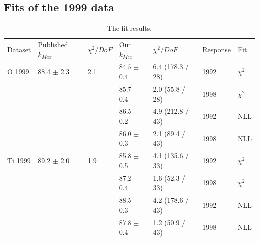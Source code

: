 \subsection { Fits of the 1999 data }

\begin{table}[H]
  \begin{center}
    \begin{tabular}{|l||l|l|l|l|l|l|}
      \hline
      Dataset & Published $k_{Max}$ & $\chi^2 / DoF$ & Our $k_{Max}$ & $\chi^2 / DoF$  & Response & Fit \\
      \hhline{|=||=|=|=|=|=|=|}
       O 1999    & 88.4 $\pm$ 2.3 & 2.1 & 84.5 $\pm$ 0.4 & 6.4 (178.3 / 28)& 1992 & $\chi^2$ \\  
                 &                &     & 85.7 $\pm$ 0.4 & 2.0 (55.8 / 28) & 1998 & $\chi^2$ \\  
                                                                            
                 &                &     & 86.5 $\pm$ 0.2 & 4.9 (212.8 / 43)& 1992 & NLL\\
                 &                &     & 86.0 $\pm$ 0.3 & 2.1 (89.4 / 43) & 1998 & NLL\\
      \hline                                                                
       Ti 1999   & 89.2 $\pm$ 2.0 & 1.9 & 85.8 $\pm$ 0.5 & 4.1 (135.6 / 33)& 1992 & $\chi^2$ \\  
                 &                &     & 87.2 $\pm$ 0.4 & 1.6 (52.3 / 33) & 1998 & $\chi^2$ \\  
                                                                            
                 &                &     & 88.5 $\pm$ 0.3 & 4.2 (178.6 / 43) & 1992 & NLL \\
                 &                &     & 87.8 $\pm$ 0.4 & 1.2 (50.9 / 43) & 1998 & NLL \\
      \hline                           
    \end{tabular}
  \end{center}
  \caption{The fit results.}
  \label{table:fits1999}
\end{table}

